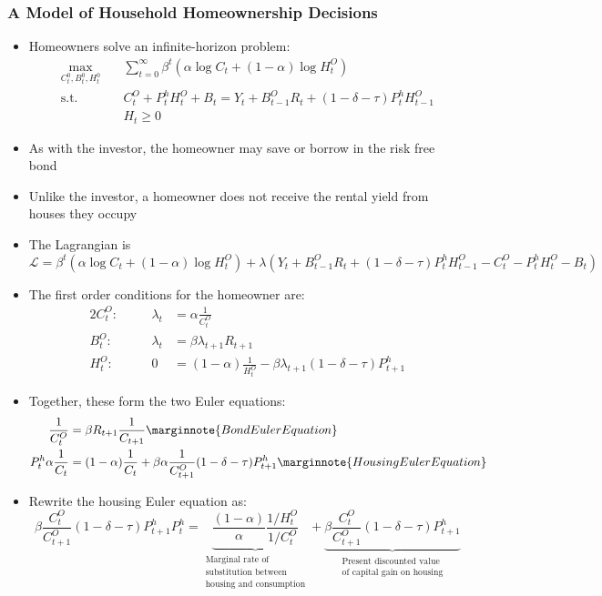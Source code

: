 \documentclass[a4paper]{article}
\begin{document}
\subsubsection{A Model of Household Homeownership Decisions}
	\begin{itemize}
		\item Homeowners solve an infinite-horizon problem:
		\begin{align*}
			\max_{C_t^0,B_t^0,H_t^0}\quad &\sum_{t=0}^{\infty} \beta^t (\alpha\log C_t+(1-\alpha)\log H_t^O) \\
			\text{s.t.}\quad &C_t^O + P_t^h H_t^O + B_t = Y_t + B_{t-1}^O R_t + (1-\delta-\tau)P_t^h H_{t-1}^O\\
			& H_t \geq 0
		\end{align*}
		\item As with the investor, the homeowner may \textcolor{myblue}{save} or \textcolor{myblue}{borrow} in the risk free bond
		\item Unlike the investor, a homeowner does not receive the rental yield from houses they occupy
		\item The Lagrangian is
		\[
			\mathcal{L} = \beta^t (\alpha\log C_t+(1-\alpha)\log H_t^O) + \lambda(Y_t + B_{t-1}^O R_t + (1-\delta-\tau)P_t^h H_{t-1}^O - C_t^O - P_t^h H_t^O - B_t)
		\]
		\item The first order conditions for the homeowner are:
		\begin{alignat*}{2}
			C_t^O:\quad && \lambda_t&= \alpha\frac{1}{C_t^O}\\
			B_t^O:\quad && \lambda_t&= \beta\lambda_{t+1}R_{t+1}\\
			H_t^O:\quad && 0&= (1-\alpha)\frac{1}{H_t^O}-\beta\lambda_{t+1}(1-\delta-\tau)P_{t+1}^h
		\end{alignat*}
		\item Together, these form the two Euler equations:
		\begin{align*}{2}
			\frac{1}{C_t^O} &= \beta R_{t+1} \frac{1}{C_{t+1}} \marginnote{Bond Euler Equation}\\
			P_t^h \alpha\frac{1}{C_t} &= (1-\alpha)\frac{1}{C_t} + \beta\alpha\frac{1}{C_{t+1}^O} (1-\delta-\tau)P_{t+1}^h \marginnote{Housing Euler Equation}
		\end{align*}
		\item Rewrite the housing Euler equation as:
		\[\beta\frac{C_t^O}{C_{t+1}^O}(1-\delta-\tau)P_{t+1}^h
			P_t^h = \underbrace{\frac{(1-\alpha)}{\alpha}\frac{1/H_t^O}{1/C_t^O}}_{\substack{\text{Marginal rate of}\\\text{substitution between}\\\text{housing and consumption}}} + \underbrace{\beta\frac{C_t^O}{C_{t+1}^O} (1-\delta-\tau)P_{t+1}^h}_{\substack{\text{Present discounted value}\\\text{of capital gain on housing}}}
\]
\end{itemize}
\end{document}
